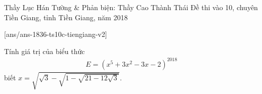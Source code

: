 \begin{name}
{Thầy Lục Hán Tường \& Phản biện: Thầy Cao Thành Thái}
{Đề thi vào 10, chuyên Tiền Giang, tỉnh Tiền Giang, năm 2018}
\end{name}
\setcounter{ex}{0}
[ans/ans-1836-ts10c-tiengiang-v2]
\begin{ex}%
	Tính giá trị của biểu thức 
	\begin{align*}
		E = \left(x^5 + 3x^2 - 3x - 2\right)^{2018}
	\end{align*}
	biết $ x = \sqrt{\sqrt{3} - \sqrt{1 - \sqrt{21 - 12\sqrt{3}}}} $.
\end{ex}

